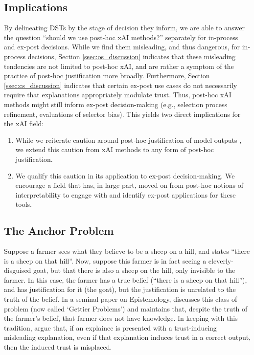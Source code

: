 \subsection{Implications}
By delineating DSTs by the stage of decision they inform, we are able to answer the question ``should we use post-hoc xAI methods?'' separately for in-process and ex-post decisions. While we find them misleading, and thus dangerous, for in-process decisions, Section \ref{ssec:os_discussion} indicates that these misleading tendencies are not limited to post-hoc xAI, and are rather a symptom of the practice of post-hoc justification more broadly. Furthermore, Section \ref{ssec:cs_discussion} indicates that certain ex-post use cases do not necessarily require that explanations appropriately modulate trust. Thus, post-hoc xAI methods might still inform ex-post decision-making (e.g., selection process refinement, evaluations of selector bias). This yields two direct implications for the xAI field:

\begin{enumerate}
    \item While we reiterate caution around post-hoc justification of model outputs \cite{miller_explainable_2023, Lipton, bansal_does_2021, ford_play_2020, jacobs_how_2021}, we extend this caution from xAI methods to any form of post-hoc justification.
    \item We qualify this caution in its application to ex-post decision-making. We encourage a field that has, in large part, moved on from post-hoc notions of interpretability \cite{kumar_problems_2020,barocas_hidden_2020,Lipton,karimi_algorithmic_2021} to engage with and identify ex-post applications for these tools.
\end{enumerate}

\subsection{The Anchor Problem}\label{ssec:anchor_problem}
Suppose a farmer sees what they believe to be a sheep on a hill, and states ``there is a sheep on that hill''. Now, suppose this farmer is in fact seeing a cleverly-disguised goat, but that there is also a sheep on the hill, only invisible to the farmer. In this case, the farmer has a true belief (``there is a sheep on that hill''), and has justification for it (the goat), but the justification is unrelated to the truth of the belief. In a seminal paper on Epistemology, \textcite{Gettier_1963} discusses this class of problem (now called `Gettier Problems') and maintains that, despite the truth of the farmer's belief, that farmer does not have knowledge. In keeping with this tradition, \textcite{Cabitza_Fregosi_Campagner_Natali_2024} argue that, if an explainee is presented with a trust-inducing misleading explanation, even if that explanation induces trust in a correct output, then the induced trust is misplaced.

